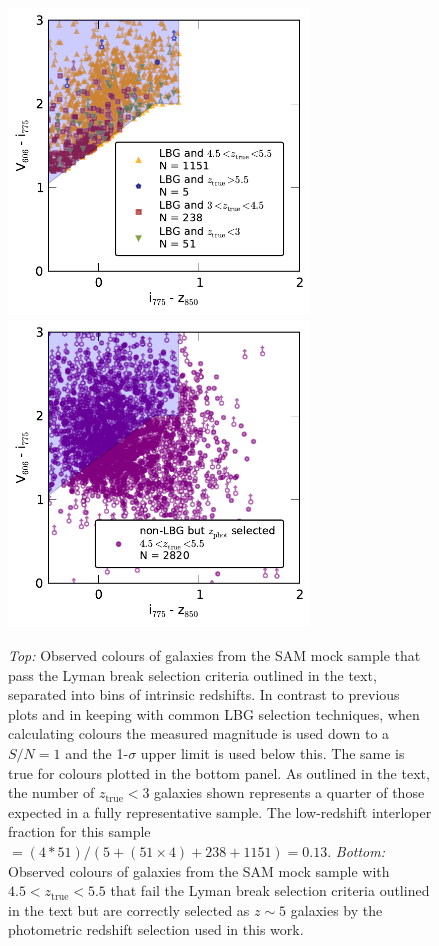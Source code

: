 \begin{figure}
\centering
\includegraphics[width=80mm]{plots/figA3a.pdf}
\includegraphics[width=80mm]{plots/figA3b.pdf}
\caption[Observed colours of galaxies from the SAM mock sample that pass and fail the Lyman break selection criteria.]{\emph{Top:} Observed colours of galaxies from the SAM mock sample that pass the Lyman break selection criteria outlined in the text, separated into bins of intrinsic redshifts. In contrast to previous plots and in keeping with common LBG selection techniques, when calculating colours the measured magnitude is used down to a $S/N = 1$ and the 1-$\sigma$ upper limit is used below this. The same is true for colours plotted in the bottom panel. As outlined in the text, the number of $z_{\text{true}} < 3$ galaxies shown represents a quarter of those expected in a fully representative sample. The low-redshift interloper fraction for this sample $= (4*51) / (5 + (51 \times 4) + 238 + 1151) = 0.13$. \emph{Bottom:} Observed colours of galaxies from the SAM mock sample with $4.5 < z_{\text{true}} < 5.5$ that fail the Lyman break selection criteria outlined in the text but are correctly selected as $z\sim5$ galaxies by the photometric redshift selection used in this work.}
\label{smf-fig:mock_col_LBG}
\end{figure}

